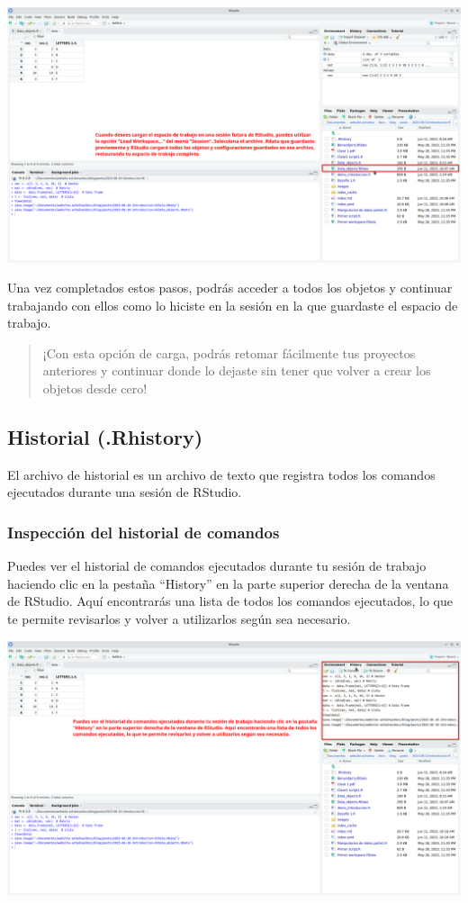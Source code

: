 \documentclass[
  letterpaper,
  DIV=11,
  numbers=noendperiod]{scrartcl}
\begin{document}
\includegraphics{images/Screenshot_20230611_100949.png}

Una vez completados estos pasos, podrás acceder a todos los objetos y
continuar trabajando con ellos como lo hiciste en la sesión en la que
guardaste el espacio de trabajo.

\begin{quote}
¡Con esta opción de carga, podrás retomar fácilmente tus proyectos
anteriores y continuar donde lo dejaste sin tener que volver a crear los
objetos desde cero!
\end{quote}

\hypertarget{historial-.rhistory}{%
\subsection{Historial (.Rhistory)}\label{historial-.rhistory}}

El archivo de historial es un archivo de texto que registra todos los
comandos ejecutados durante una sesión de RStudio.

\hypertarget{inspecciuxf3n-del-historial-de-comandos}{%
\subsubsection{Inspección del historial de
comandos}\label{inspecciuxf3n-del-historial-de-comandos}}

Puedes ver el historial de comandos ejecutados durante tu sesión de
trabajo haciendo clic en la pestaña ``History'' en la parte superior
derecha de la ventana de RStudio. Aquí encontrarás una lista de todos
los comandos ejecutados, lo que te permite revisarlos y volver a
utilizarlos según sea necesario.

\includegraphics{images/Screenshot_20230611_101644.png}
\end{document}
